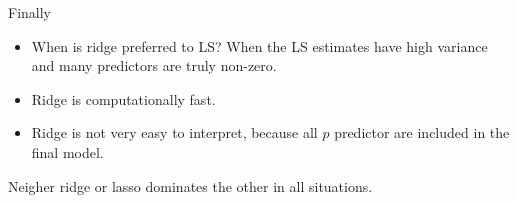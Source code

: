 \documentclass[
  ignorenonframetext,
]{beamer}
\providecommand{\tightlist}{%
  \setlength{\itemsep}{0pt}\setlength{\parskip}{0pt}}
\begin{document}
\begin{frame}

\begin{block}{Finally}

\begin{itemize}
\tightlist
\item
  When is ridge preferred to LS? When the LS estimates have high
  variance and many predictors are truly non-zero.
\item
  Ridge is computationally fast.
\item
  Ridge is not very easy to interpret, because all \(p\) predictor are
  included in the final model.
\end{itemize}

Neigher ridge or lasso dominates the other in all situations.

\end{block}

\end{frame}
\end{document}
